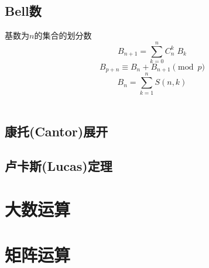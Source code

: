 \subsection{Bell数}
基数为$n$的集合的划分数
\begin{displaymath}
B_{n+1} = \sum_{k=0}^{n} C_{n}^{k}\;B_{k}
\end{displaymath}
\begin{displaymath}
B_{p+n} \equiv B_{n} + B_{n+1} \pmod p
\end{displaymath}
\begin{displaymath}
B_{n} = \sum_{k=1}^{n} S(n, k)
\end{displaymath}\\

\subsection{康托(Cantor)展开}

\subsection{卢卡斯(Lucas)定理}

\section{大数运算}

\section{矩阵运算}
